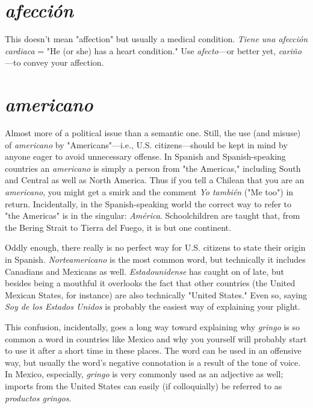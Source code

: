 \documentclass[14pt,a4paper,oneside]{memoir}
\begin{document}
\section{\emph{afección}}

This doesn't mean "affection" but usually a
medical condition. \emph{Tiene una afección cardiaca} = "He (or she) has a
heart condition." Use \emph{afecto}---or better yet, \emph{cariño}---to convey your
affection.

\section{\emph{americano}}

Almost more of a political issue than a semantic one. Still, the use (and misuse) of \emph{americano} by "Americans"---i.e.,
U.S. citizens---should be kept in mind by anyone eager to avoid unnecessary offense. In Spanish and Spanish-speaking countries an \emph{americano} is simply a person from "the Americas," including South and
Central as well as North America. Thus if you tell a Chilean that you
are an \emph{americano}, you might get a smirk and the comment \emph{Yo también} ("Me too") in return. Incidentally, in the Spanish-speaking world
the correct way to refer to "the Americas" is in the singular: \emph{América}.
Schoolchildren are taught that, from the Bering Strait to Tierra del
Fuego, it is but one continent.

Oddly enough, there really is no perfect way for U.S. citizens
to state their origin in Spanish. \emph{Norteamericano} is the most common
word, but technically it includes Canadians and Mexicans as well. \emph{Estadounidense} has caught on of late, but besides being a mouthful it
overlooks the fact that other countries (the United Mexican States, for
instance) are also technically "United States." Even so, saying \emph{Soy de
los Estados Unidos} is probably the easiest way of explaining your
plight.

This confusion, incidentally, goes a long way toward explaining why \emph{gringo} is so common a word in countries like Mexico and why
you yourself will probably start to use it after a short time in these
places. The word can be used in an offensive way, but usually the
word's negative connotation is a result of the tone of voice. In Mexico,
especially, \emph{gringo} is very commonly used as an adjective as well; imports from the United States can easily (if colloquially) be referred to
as \emph{productos gringos}.
\end{document}
